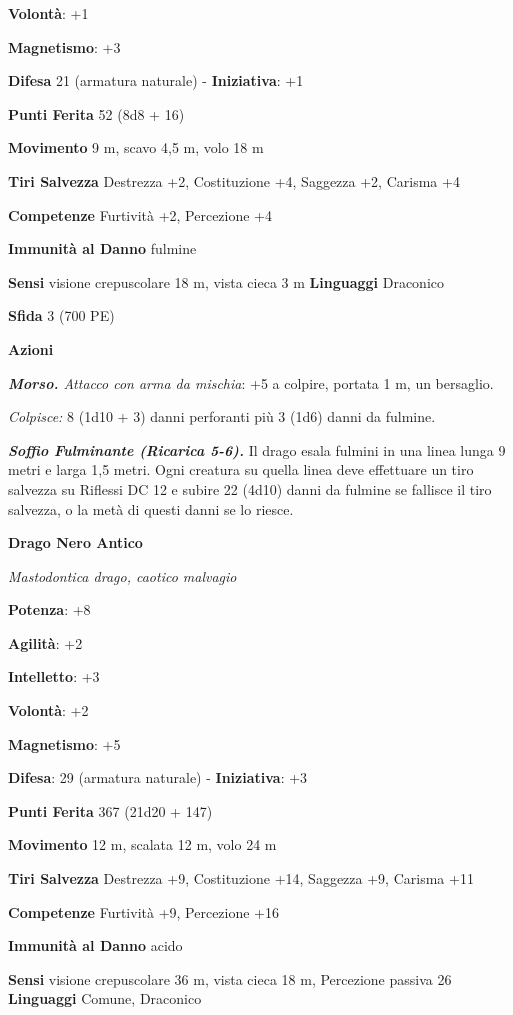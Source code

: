\begin{multicols}{2}
\textbf{Volontà}: +1

\textbf{Magnetismo}: +3

\textbf{Difesa} 21 (armatura naturale) - \textbf{Iniziativa}: +1

\textbf{Punti Ferita} 52 (8d8 + 16)

\textbf{Movimento} 9 m, scavo 4,5 m, volo 18 m

\textbf{Tiri Salvezza} Destrezza +2, Costituzione +4, Saggezza +2,
Carisma +4

\textbf{Competenze} Furtività +2, Percezione +4

\textbf{Immunità al Danno} fulmine

\textbf{Sensi} visione crepuscolare 18 m, vista cieca 3 m
\textbf{Linguaggi} Draconico

\textbf{Sfida} 3 (700 PE)\smallskip

\smallskip\textbf{Azioni}

\emph{\textbf{Morso.} Attacco con arma da mischia}: +5 a colpire,
portata 1 m, un bersaglio.

\emph{Colpisce:} 8 (1d10 + 3) danni perforanti più 3 (1d6) danni da
fulmine.

\emph{\textbf{Soffio Fulminante (Ricarica 5-6).}} Il drago esala fulmini
in una linea lunga 9 metri e larga 1,5 metri. Ogni creatura su quella
linea deve effettuare un tiro salvezza su Riflessi DC 12 e subire 22
(4d10) danni da fulmine se fallisce il tiro salvezza, o la metà di
questi danni se lo riesce.

\textbf{Drago Nero Antico}

\emph{Mastodontica drago, caotico malvagio}

\textbf{Potenza}: +8

\textbf{Agilità}: +2

\textbf{Intelletto}: +3

\textbf{Volontà}: +2

\textbf{Magnetismo}: +5

\textbf{Difesa}: 29 (armatura naturale) - \textbf{Iniziativa}: +3

\textbf{Punti Ferita} 367 (21d20 + 147)

\textbf{Movimento} 12 m, scalata 12 m, volo 24 m

\textbf{Tiri Salvezza} Destrezza +9, Costituzione +14, Saggezza +9,
Carisma +11

\textbf{Competenze} Furtività +9, Percezione +16

\textbf{Immunità al Danno} acido

\textbf{Sensi} visione crepuscolare 36 m, vista cieca 18 m, Percezione passiva
26 \textbf{Linguaggi} Comune, Draconico


\end{multicols}
